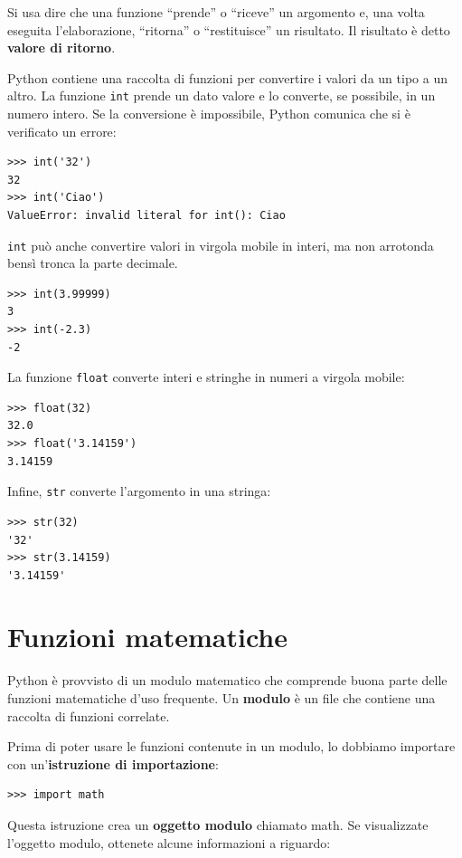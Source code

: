 \documentclass[10pt]{book}
\begin{document}
Si usa dire che una funzione ``prende'' o ``riceve'' un argomento e, una volta eseguita l'elaborazione, ``ritorna'' o ``restituisce'' un risultato.  Il risultato è detto {\bf valore di ritorno}.

Python contiene una raccolta di funzioni per convertire i valori da un tipo a un altro. La funzione {\tt int} prende un dato valore e lo converte, se possibile, in un numero intero. Se la conversione è impossibile, Python comunica che si è verificato un errore:

\begin{verbatim}
>>> int('32')
32
>>> int('Ciao')
ValueError: invalid literal for int(): Ciao
\end{verbatim}
%
{\tt int} può anche convertire valori in virgola mobile in interi, ma non arrotonda bensì tronca la parte decimale.

\begin{verbatim}
>>> int(3.99999)
3
>>> int(-2.3)
-2
\end{verbatim}
%
La funzione {\tt float} converte interi e stringhe in numeri a virgola mobile:

\begin{verbatim}
>>> float(32)
32.0
>>> float('3.14159')
3.14159
\end{verbatim}
%
Infine, {\tt str} converte l'argomento in una stringa:

\begin{verbatim}
>>> str(32)
'32'
>>> str(3.14159)
'3.14159'
\end{verbatim}
%

\section{Funzioni matematiche}

Python è provvisto di un modulo matematico che comprende buona parte delle funzioni matematiche d'uso frequente. Un {\bf modulo} è un file che contiene una raccolta di funzioni correlate.

Prima di poter usare le funzioni contenute in un modulo, lo dobbiamo importare con un'{\bf istruzione di importazione}:

\begin{verbatim}
>>> import math
\end{verbatim}
%
Questa istruzione crea un {\bf oggetto modulo} chiamato math. Se visualizzate l'oggetto modulo, ottenete alcune informazioni a riguardo:
\end{document}
